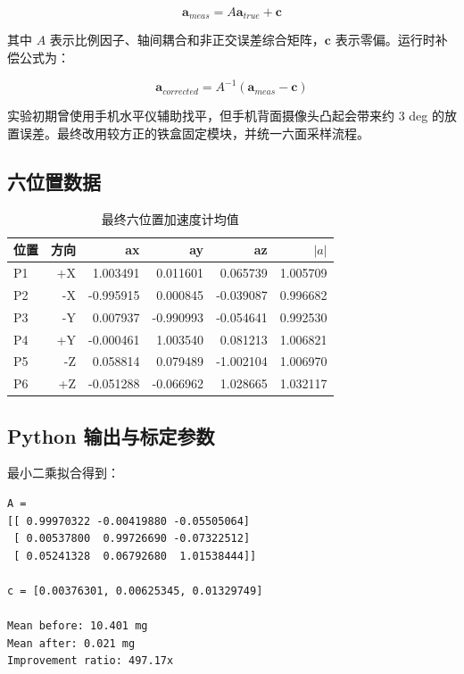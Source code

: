 \documentclass[UTF8,a4paper,12pt]{ctexart}
\begin{document}
\begin{equation}
\mathbf{a}_{meas}=A\mathbf{a}_{true}+\mathbf{c}
\end{equation}

其中 \(A\) 表示比例因子、轴间耦合和非正交误差综合矩阵，\(\mathbf{c}\) 表示零偏。运行时补偿公式为：

\begin{equation}
\mathbf{a}_{corrected}=A^{-1}(\mathbf{a}_{meas}-\mathbf{c})
\end{equation}

实验初期曾使用手机水平仪辅助找平，但手机背面摄像头凸起会带来约 3 deg 的放置误差。最终改用较方正的铁盒固定模块，并统一六面采样流程。

\subsection{六位置数据}
\begin{table}[H]
\centering
\caption{最终六位置加速度计均值}
\small
\begin{tabular}{lrrrrr}
\toprule
位置 & 方向 & ax & ay & az & \(|a|\)\\
\midrule
P1 & +X & 1.003491 & 0.011601 & 0.065739 & 1.005709\\
P2 & -X & -0.995915 & 0.000845 & -0.039087 & 0.996682\\
P3 & -Y & 0.007937 & -0.990993 & -0.054641 & 0.992530\\
P4 & +Y & -0.000461 & 1.003540 & 0.081213 & 1.006821\\
P5 & -Z & 0.058814 & 0.079489 & -1.002104 & 1.006970\\
P6 & +Z & -0.051288 & -0.066962 & 1.028665 & 1.032117\\
\bottomrule
\end{tabular}
\end{table}

\subsection{Python 输出与标定参数}
最小二乘拟合得到：

\begin{lstlisting}
A =
[[ 0.99970322 -0.00419880 -0.05505064]
 [ 0.00537800  0.99726690 -0.07322512]
 [ 0.05241328  0.06792680  1.01538444]]

c = [0.00376301, 0.00625345, 0.01329749]

Mean before: 10.401 mg
Mean after: 0.021 mg
Improvement ratio: 497.17x
\end{lstlisting}
\end{document}
